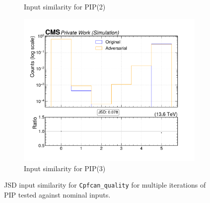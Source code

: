 \begin{figure}[htbp]
\begin{subfigure}[t]{0.32\textwidth}
    \caption{Input similarity for PIP(2)}
  \end{subfigure}\hfill
  \begin{subfigure}[t]{0.32\textwidth}
    \includegraphics[width=\linewidth]{media/output/features/compare/intprob_3/cmp_cpf_arr_Cpfcan_quality.pdf}
    \caption{Input similarity for PIP(3)}
  \end{subfigure}

  \caption{JSD input similarity for \texttt{Cpfcan\_quality} for multiple iterations of PIP tested against nominal inputs.}
  \label{fig:intprob_input_Cpfcan_quality}
\end{figure}
